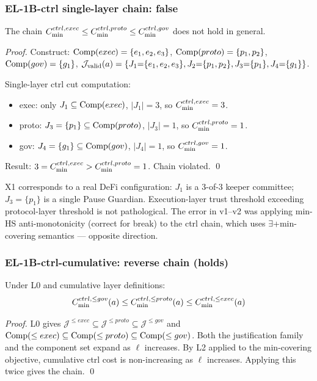 \subsubsection*{EL-1B-ctrl single-layer chain: false}

\begin{proposition}[X1 counterexample]\label{prop:x1}
The chain
$C_{\min}^{ctrl,exec}\le C_{\min}^{ctrl,proto}\le C_{\min}^{ctrl,gov}$
does not hold in general.
\end{proposition}
\begin{proof}
Construct:
$\mathrm{Comp}(exec)=\{e_1,e_2,e_3\}$,
$\mathrm{Comp}(proto)=\{p_1,p_2\}$,
$\mathrm{Comp}(gov)=\{g_1\}$,
$\mathcal{J}_{\mathrm{valid}}(a)=\{J_1{=}\{e_1,e_2,e_3\},J_2{=}\{p_1,p_2\},J_3{=}\{p_1\},J_4{=}\{g_1\}\}$.

Single-layer ctrl cut computation:
\begin{itemize}
  \item exec: only $J_1\subseteq\mathrm{Comp}(exec)$, $|J_1|=3$,
    so $C_{\min}^{ctrl,exec}=3$.
  \item proto: $J_3=\{p_1\}\subseteq\mathrm{Comp}(proto)$, $|J_3|=1$,
    so $C_{\min}^{ctrl,proto}=1$.
  \item gov: $J_4=\{g_1\}\subseteq\mathrm{Comp}(gov)$, $|J_4|=1$,
    so $C_{\min}^{ctrl,gov}=1$.
\end{itemize}
Result: $3=C_{\min}^{ctrl,exec}>C_{\min}^{ctrl,proto}=1$. Chain violated. \qed
\end{proof}

\begin{remark}
X1 corresponds to a real DeFi configuration: $J_1$ is a 3-of-3 keeper committee;
$J_3=\{p_1\}$ is a single Pause Guardian.
Execution-layer trust threshold exceeding protocol-layer threshold is not pathological.
The error in v1--v2 was applying min-HS anti-monotonicity (correct for break)
to the ctrl chain, which uses $\exists$+min-covering semantics --- opposite direction.
\end{remark}

\subsubsection*{EL-1B-ctrl-cumulative: reverse chain (holds)}

\begin{theorem}\label{thm:el1b-ctrl-cumul}
Under L0 and cumulative layer definitions:
$$C_{\min}^{ctrl,\le gov}(a)\le C_{\min}^{ctrl,\le proto}(a)\le C_{\min}^{ctrl,\le exec}(a)$$
\end{theorem}
\begin{proof}
L0 gives $\mathcal{J}^{\le exec}\subseteq\mathcal{J}^{\le proto}\subseteq\mathcal{J}^{\le gov}$
and $\mathrm{Comp}(\le exec)\subseteq\mathrm{Comp}(\le proto)\subseteq\mathrm{Comp}(\le gov)$.
Both the justification family and the component set expand as $\ell$ increases.
By L2 applied to the min-covering objective, cumulative ctrl cost is non-increasing
as $\ell$ increases. Applying this twice gives the chain. \qed
\end{proof}

